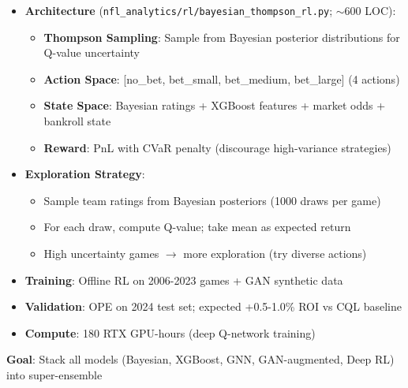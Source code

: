 \begin{itemize}
  \item {} \textbf{Architecture} (\texttt{nfl\_analytics/rl/bayesian\_thompson\_rl.py}; $\sim$600 LOC):
  \begin{itemize}
    \item \textbf{Thompson Sampling}: Sample from Bayesian posterior distributions for Q-value uncertainty
    \item \textbf{Action Space}: [no\_bet, bet\_small, bet\_medium, bet\_large] (4 actions)
    \item \textbf{State Space}: Bayesian ratings + XGBoost features + market odds + bankroll state
    \item \textbf{Reward}: PnL with CVaR penalty (discourage high-variance strategies)
  \end{itemize}
  \item {} \textbf{Exploration Strategy}:
  \begin{itemize}
    \item Sample team ratings from Bayesian posteriors (1000 draws per game)
    \item For each draw, compute Q-value; take mean as expected return
    \item High uncertainty games $\to$ more exploration (try diverse actions)
  \end{itemize}
  \item {} \textbf{Training}: Offline RL on 2006-2023 games + GAN synthetic data
  \item {} \textbf{Validation}: OPE on 2024 test set; expected +0.5-1.0\% ROI vs CQL baseline
  \item \textbf{Compute}: 180 RTX GPU-hours (deep Q-network training)
\end{itemize}

\textbf{Goal}: Stack all models (Bayesian, XGBoost, GNN, GAN-augmented, Deep RL) into super-ensemble

